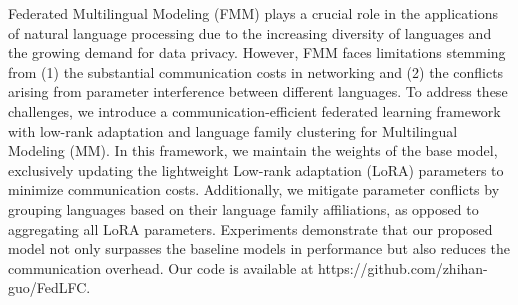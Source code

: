 Federated Multilingual Modeling (FMM) plays a crucial role in the applications of natural language processing due to the increasing diversity of languages and the growing demand for data privacy. However, FMM faces limitations stemming from (1) the substantial communication costs in networking and (2) the conflicts arising from parameter interference between different languages. To address these challenges, we introduce a communication-efficient federated learning framework with low-rank adaptation and language family clustering for Multilingual Modeling (MM). In this framework, we maintain the weights of the base model, exclusively updating the lightweight Low-rank adaptation (LoRA) parameters to minimize communication costs. Additionally, we mitigate parameter conflicts by grouping languages based on their language family affiliations, as opposed to aggregating all LoRA parameters. Experiments demonstrate that our proposed model not only surpasses the baseline models in performance but also reduces the communication overhead. Our code is available at https://github.com/zhihan-guo/FedLFC.